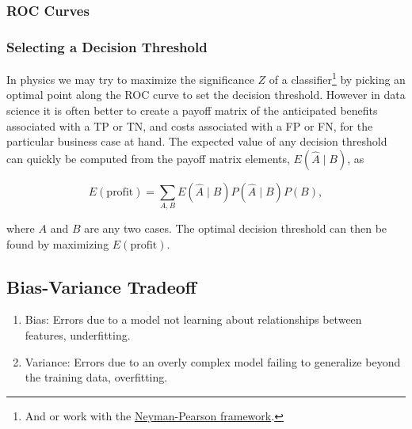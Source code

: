 
\subsubsection{ROC Curves}
\label{ml:general:eval:ROC}

\subsubsection{Selecting a Decision Threshold}
\label{ml:general:eval:decision_threshold}


In physics we may try to maximize the significance $Z$ of a classifier\footnote{And or
work with the \href{https://en.wikipedia.org/wiki/Neyman\%E2\%80\%93Pearson\_lemma}{Neyman-Pearson framework}.} by
picking an optimal point along the ROC curve to set the decision threshold.
However in data science it is often better to create a payoff matrix of the anticipated
benefits associated with a TP or TN, and costs associated with a FP or FN,
for the particular business case at hand.
The expected value of any decision threshold can quickly be computed
from the payoff matrix elements, $E\left( \hat{A} \mid B\right)$, as

\begin{equation} \label{eq:E_profit}
E\left(\text{profit}\right) = \sum_{A,B} E\left( \hat{A} \mid B\right) P\left(\hat{A} \mid B \right) P\left(B\right),
\end{equation}

\noindent where $A$ and $B$ are any two cases.
The optimal decision threshold can then be found by maximizing $E\left(\text{profit}\right)$.

\subsection{Bias-Variance Tradeoff}
\label{ml:general:biasVar}

\begin{enumerate}[noitemsep]
\item Bias: Errors due to a model not learning about relationships between features, \ie underfitting.
\item Variance: Errors due to an overly complex model failing to generalize beyond the training data, \ie overfitting.
\end{enumerate}


